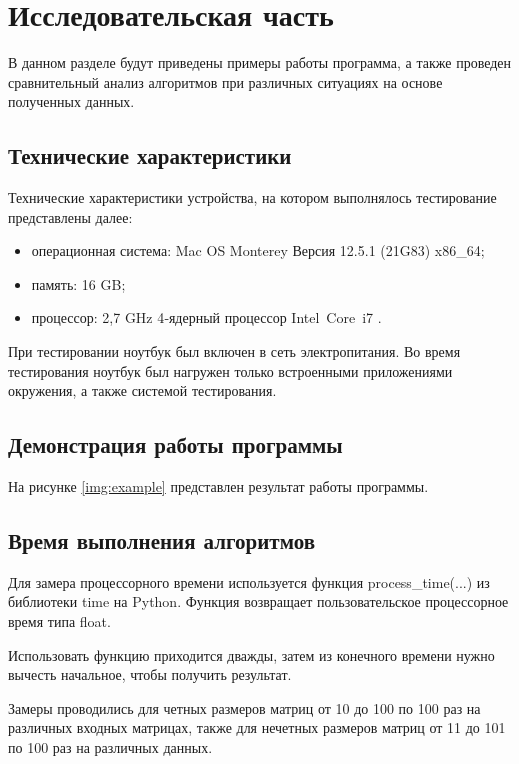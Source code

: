 \chapter{Исследовательская часть}

В данном разделе будут приведены примеры работы программа, а также проведен сравнительный анализ алгоритмов при различных ситуациях на основе полученных данных.

\section{Технические характеристики}

Технические характеристики устройства, на котором выполнялось тестирование представлены далее:

\begin{itemize}
	\item операционная система: Mac OS Monterey Версия 12.5.1 (21G83) \cite{macos} x86\_64;
	\item память: 16 GB;
	\item процессор: 2,7 GHz 4‑ядерный процессор Intel Core i7 \cite{intel}.
\end{itemize}

При тестировании ноутбук был включен в сеть электропитания. Во время тестирования ноутбук был нагружен только встроенными приложениями окружения, а также системой тестирования.

\section{Демонстрация работы программы}

На рисунке \ref{img:example} представлен результат работы программы.

\clearpage

\section{Время выполнения алгоритмов}

Для замера процессорного времени используется функция process\_time(...) из библиотеки time на Python. Функция возвращает пользовательское процессорное время типа float.

Использовать функцию приходится дважды, затем из конечного времени нужно вычесть начальное, чтобы получить результат.

Замеры проводились для четных размеров матриц от 10 до 100 по 100 раз на различных входных матрицах,  также  для нечетных размеров матриц от 11 до 101 по 100 раз на различных данных.

